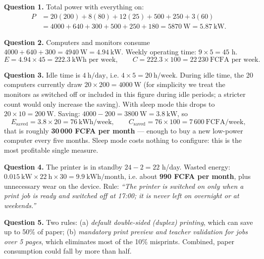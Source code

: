 \documentclass[11pt]{article}
\newcounter{popsec}
\newcounter{popsub}
\newcommand{\courssub}[1]{%
  \stepcounter{popsub}%
  \par\vspace{9pt}\noindent{\popxbold\fontsize{11.5}{13}\selectfont\color{popink}{\color{poporange}\thepopsec.\thepopsub}\hspace{6pt}#1}\par\nopagebreak\vspace{4pt}
}
\begin{document}
\courssub{Model answer}

\textbf{Question 1.} Total power with everything on:
\begin{align*}
P &= 20(200) + 8(80) + 12(25) + 500 + 250 + 3(60)\\
  &= 4000 + 640 + 300 + 500 + 250 + 180 = 5870\ \text{W} = 5.87\ \text{kW}.
\end{align*}

\textbf{Question 2.} Computers and monitors consume $4000 + 640 + 300 = 4940\ \text{W} = 4.94\ \text{kW}$. Weekly operating time: $9 \times 5 = 45$ h.
\[ E = 4.94 \times 45 = 222.3\ \text{kWh per week}, \qquad C = 222.3 \times 100 = 22\,230\ \text{FCFA per week}. \]

\textbf{Question 3.} Idle time is $4\ \text{h/day}$, i.e. $4 \times 5 = 20\ \text{h/week}$. During idle time, the 20 computers currently draw $20 \times 200 = 4000\ \text{W}$ (for simplicity we treat the monitors as switched off or included in this figure during idle periods; a stricter count would only increase the saving). With sleep mode this drops to $20 \times 10 = 200\ \text{W}$. Saving: $4000 - 200 = 3800\ \text{W} = 3.8\ \text{kW}$, so
\[ E_{\text{saved}} = 3.8 \times 20 = 76\ \text{kWh/week}, \qquad C_{\text{saved}} = 76 \times 100 = 7\,600\ \text{FCFA/week}, \]
that is roughly \textbf{30\,000 FCFA per month} --- enough to buy a new low-power computer every five months. Sleep mode costs nothing to configure: this is the most profitable single measure.

\textbf{Question 4.} The printer is in standby $24 - 2 = 22$ h/day. Wasted energy: $0.015\ \text{kW} \times 22\ \text{h} \times 30 = 9.9\ \text{kWh/month}$, i.e. about \textbf{990 FCFA per month}, plus unnecessary wear on the device. Rule: \emph{``The printer is switched on only when a print job is ready and switched off at 17:00; it is never left on overnight or at weekends.''}

\textbf{Question 5.} Two rules: (a) \emph{default double-sided (duplex) printing}, which can save up to 50\% of paper; (b) \emph{mandatory print preview and teacher validation for jobs over 5 pages}, which eliminates most of the 10\% misprints. Combined, paper consumption could fall by more than half.
\end{document}
